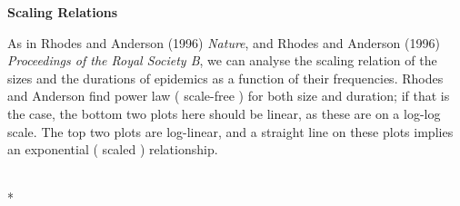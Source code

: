 \documentclass[letterpaper,10pt,english]{/Users/qcaudron/anaconda/lib/python2.7/site-packages/Sphinx-1.2b1-py2.7.egg/sphinx/texinputs/sphinxhowto}
\def\smaller{\fontsize{9.5pt}{9.5pt}\selectfont}
\begin{document}
\textbf{Scaling Relations}

As in Rhodes and Anderson (1996) \emph{Nature}, and Rhodes and Anderson
(1996) \emph{Proceedings of the Royal Society B}, we can analyse the
scaling relation of the sizes and the durations of epidemics as a
function of their frequencies. Rhodes and Anderson find power law (
scale-free ) for both size and duration; if that is the case, the bottom
two plots here should be linear, as these are on a log-log scale. The
top two plots are log-linear, and a straight line on these plots implies
an exponential ( scaled ) relationship.


    
        \vspace{6pt}
        \makebox[0.1\linewidth]{\smaller\hfill\tt\color{nbframe-in-prompt}In\hspace{4pt}{[}256{]}:\hspace{4pt}}\\*
        \vspace{-2.65\baselineskip}
\end{document}
